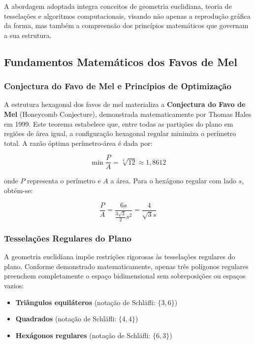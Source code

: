 \documentclass[12pt,a4paper,oneside]{extarticle}
\begin{document}
A abordagem adoptada integra conceitos de geometria euclidiana, teoria de tesselações e algoritmos computacionais, visando não apenas a reprodução gráfica da forma, mas também a compreensão dos princípios matemáticos que governam a sua estrutura.

\subsection{Fundamentos Matemáticos dos Favos de Mel}

\subsubsection{Conjectura do Favo de Mel e Princípios de Optimização}
A estrutura hexagonal dos favos de mel materializa a \textbf{Conjectura do Favo de Mel} (Honeycomb Conjecture), demonstrada matematicamente por Thomas Hales em 1999. Este teorema estabelece que, entre todas as partições do plano em regiões de área igual, a configuração hexagonal regular minimiza o perímetro total. A razão óptima perímetro-área é dada por:

\begin{equation}
\min \frac{P}{A} = \sqrt[4]{12} \approx 1,8612
\label{eq:honeycomb_conjecture}
\end{equation}

onde $P$ representa o perímetro e $A$ a área. Para o hexágono regular com lado $s$, obtém-se:

\begin{equation}
\frac{P}{A} = \frac{6s}{\frac{3\sqrt{3}}{2}s^2} = \frac{4}{\sqrt{3}s}
\label{eq:hexagon_ratio}
\end{equation}


\subsubsection{Tesselações Regulares do Plano}
A geometria euclidiana impõe restrições rigorosas às tesselações regulares do plano. Conforme demonstrado matematicamente, apenas três polígonos regulares preenchem completamente o espaço bidimensional sem sobreposições ou espaços vazios:

\begin{itemize}
    \item \textbf{Triângulos equiláteros} (notação de Schläfli: $\{3,6\}$)
    \item \textbf{Quadrados} (notação de Schläfli: $\{4,4\}$) 
    \item \textbf{Hexágonos regulares} (notação de Schläfli: $\{6,3\}$)
\end{itemize}
\end{document}
